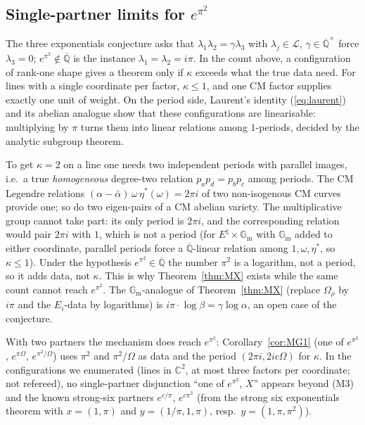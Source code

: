 \documentclass[11pt]{amsart}
\theoremstyle{definition}
\newcommand{\Qb}{\overline{\mathbb{Q}}}
\newcommand{\C}{\mathbb{C}}
\newcommand{\Gm}{\mathbb{G}_{\mathrm m}}
\newcommand{\Lg}{\mathcal{L}}
\begin{document}
\subsection{Single-partner limits for $e^{\pi^2}$}\label{sec:3E}

The three exponentials conjecture asks that $\lambda_1\lambda_2=\gamma\lambda_3$ with $\lambda_j\in\Lg$, $\gamma\in\Qb^\times$
force $\lambda_3=0$; $e^{\pi^2}\notin\Qb$ is the instance $\lambda_1=\lambda_2=i\pi$. In the count above, a configuration
of rank-one shape gives a theorem only if $\kappa$ exceeds what the true data need. For lines with a single
coordinate per factor, $\kappa\le1$, and one CM factor supplies exactly one unit of weight. On the period side,
Laurent's identity (\ref{eq:laurent}) and its abelian analogue show that these configurations are linearisable:
multiplying by $\pi$ turns them into linear relations among $1$-periods, decided by the analytic subgroup theorem.

To get $\kappa=2$ on a line one needs two independent periods with parallel images, i.e.\ a true \emph{homogeneous}
degree-two relation $p_ap_d=p_bp_c$ among periods. The CM Legendre relations $(\alpha-\bar\alpha)\,\omega\,\eta^*(\omega)=2\pi i$
of two non-isogenous CM curves provide one; so do two eigen-pairs of a CM abelian variety. The multiplicative group
cannot take part: its only period is $2\pi i$, and the corresponding relation would pair $2\pi i$ with $1$, which is not a
period (for $E^\natural\times\Gm$ with $\Gm$ added to either coordinate, parallel periods force a $\Qb$-linear relation
among $1,\omega,\eta^*$, so $\kappa\le1$). Under the hypothesis $e^{\pi^2}\in\Qb$ the number $\pi^2$ is a logarithm,
not a period, so it adds data, not $\kappa$. This is why Theorem~\ref{thm:MX} exists while the same count cannot reach
$e^{\pi^2}$. The $\Gm$-analogue of Theorem~\ref{thm:MX} (replace $\Omega_\rho$ by $i\pi$ and the $E_i$-data by logarithms)
is $i\pi\cdot\log\beta=\gamma\log\alpha$, an open case of the conjecture.

With two partners the mechanism does reach $e^{\pi^2}$: Corollary~\ref{cor:MG1} (one of $e^{\pi^2}$, $e^{\pi\Omega}$,
$e^{\pi^2/\Omega}$) uses $\pi^2$ and $\pi^2/\Omega$ as data and the period $(2\pi i,2ic\Omega)$ for $\kappa$. In the
configurations we enumerated (lines in $\C^2$, at most three factors per coordinate; not refereed), no single-partner
disjunction ``one of $e^{\pi^2}$, $X$'' appears beyond (M3) and the known strong-six partners $e^{c/\pi}$, $e^{c\pi^3}$ (from
the strong six exponentials theorem \cite[Cor.~2]{Roy92} with $x=(1,\pi)$ and $y=(1/\pi,1,\pi)$, resp.\ $y=(1,\pi,\pi^2)$).
\end{document}
